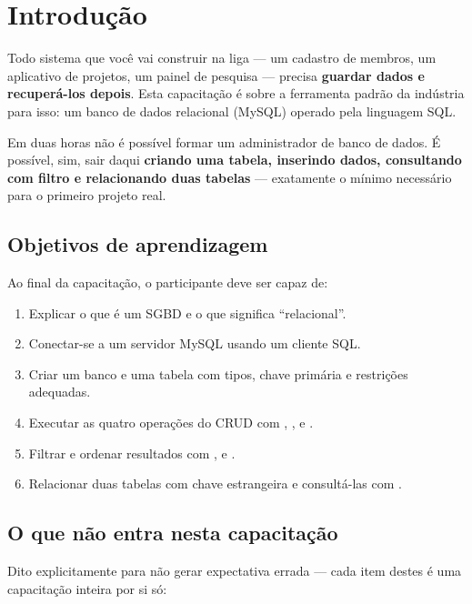 \chapter{Introdução}

Todo sistema que você vai construir na liga --- um cadastro de membros, um
aplicativo de projetos, um painel de pesquisa --- precisa \textbf{guardar dados
e recuperá-los depois}. Esta capacitação é sobre a ferramenta padrão da
indústria para isso: um banco de dados relacional (MySQL) operado pela
linguagem SQL.

Em duas horas não é possível formar um administrador de banco de dados. É
possível, sim, sair daqui \textbf{criando uma tabela, inserindo dados,
consultando com filtro e relacionando duas tabelas} --- exatamente o mínimo
necessário para o primeiro projeto real.

\section{Objetivos de aprendizagem}

Ao final da capacitação, o participante deve ser capaz de:

\begin{enumerate}
    \item Explicar o que é um SGBD e o que significa ``relacional''.
    \item Conectar-se a um servidor MySQL usando um cliente SQL.
    \item Criar um banco e uma tabela com tipos, chave primária e restrições
          adequadas.
    \item Executar as quatro operações do CRUD com ,
          ,  e .
    \item Filtrar e ordenar resultados com , 
          e .
    \item Relacionar duas tabelas com chave estrangeira e consultá-las com
          .
\end{enumerate}

\section{O que não entra nesta capacitação}

Dito explicitamente para não gerar expectativa errada --- cada item destes é
uma capacitação inteira por si só:

